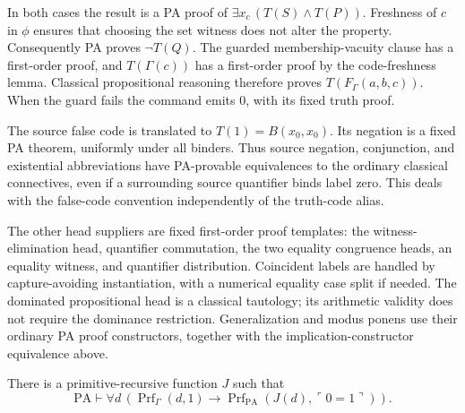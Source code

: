 In both cases the result is a PA proof of
$\exists x_c\,(T(S)\wedge T(P))$. Freshness of $c$ in $\phi$
ensures that choosing the set witness does not alter the property.
Consequently PA proves $\neg T(Q)$. The guarded membership-vacuity
clause has a first-order proof, and $T(\Gamma(c))$ has a first-order
proof by the code-freshness lemma. Classical propositional reasoning
therefore proves $T(F_\Gamma(a,b,c))$.
When the guard fails the command emits $0$, with its fixed truth proof.

The source false code is translated to $T(1)=B(x_0,x_0)$.
Its negation is a fixed PA theorem, uniformly under all binders.
Thus source negation, conjunction, and existential abbreviations have
PA-provable equivalences to the ordinary classical connectives, even
if a surrounding source quantifier binds label zero. This deals with
the false-code convention independently of the truth-code alias.

The other head suppliers are fixed first-order proof templates:
the witness-elimination head, quantifier commutation, the two equality
congruence heads, an equality witness, and quantifier distribution.
Coincident labels are handled by capture-avoiding instantiation, with
a numerical equality case split if needed. The dominated
propositional head is a classical tautology; its arithmetic validity
does not require the dominance restriction. Generalization and modus
ponens use their ordinary PA proof constructors, together with the
implication-constructor equivalence above.

\begin{lemma}
\label{lem:pa-refutation-translation}
There is a primitive-recursive function $J$ such that
\[
 \mathrm{PA}\vdash\forall d\,
 \left(\operatorname{Prf}_{\Gamma}(d,1)
 \to\operatorname{Prf}_{\mathrm{PA}}
             (J(d),\ulcorner0=1\urcorner)\right).
                                                        \tag{5}
\]
\end{lemma}

